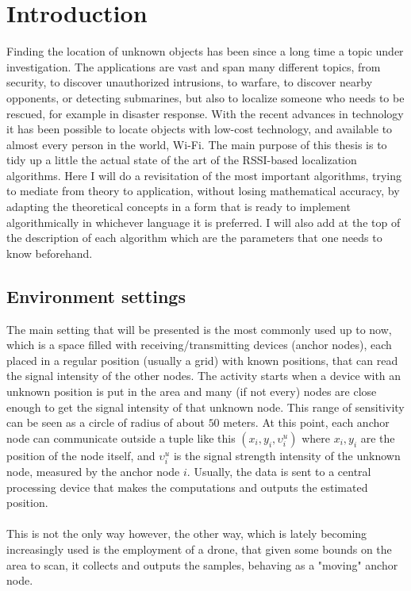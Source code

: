 \documentclass[12pt]{report}
\begin{document}
\clearpage %
\begingroup
  \thispagestyle{empty}
  \null
  \newpage
\endgroup


\thispagestyle{empty}
\tableofcontents
\thispagestyle{empty}

\clearpage %
\begingroup
  \thispagestyle{empty}
  \null
  \newpage
\endgroup


\setcounter{page}{1}

\chapter{Introduction}
Finding the location of unknown objects has been since a long time a topic under investigation. The applications are vast and span many different topics, from security, to discover unauthorized intrusions, to warfare, to discover nearby opponents, or detecting submarines, but also to localize someone who needs to be rescued, for example in disaster response. With the recent advances in technology it has been possible to locate objects with low-cost technology, and available to almost every person in the world, Wi-Fi. The main purpose of this thesis is to tidy up a little the actual state of the art of the RSSI-based localization algorithms. Here I will do a revisitation of the most important algorithms, trying to mediate from theory to application, without losing mathematical accuracy, by adapting the theoretical concepts in a form that is ready to implement algorithmically in whichever language it is preferred. I will also add at the top of the description of each algorithm which are the parameters that one needs to know beforehand.

\section{Environment settings}
The main setting that will be presented is the most commonly used up to now, which is a space filled with receiving/transmitting devices (anchor nodes), each placed in a regular position (usually a grid) with known positions, that can read the signal intensity of the other nodes. The activity starts when a device with an unknown position is put in the area and many (if not every) nodes are close enough to get the signal intensity of that unknown node. This range of sensitivity can be seen as a circle of radius of about $50$ meters. At this point, each anchor node can communicate outside a tuple like this $(x_i,y_i,\upsilon_i^u)$ where $x_i,y_i$ are the position of the node itself, and $\upsilon_i^u$ is the signal strength intensity of the unknown node, measured by the anchor node $i$. Usually, the data is sent to a central processing device that makes the computations and outputs the estimated position. \\\\
This is not the only way however, the other way, which is lately becoming increasingly used is the employment of a drone, that given some bounds on the area to scan, it collects and outputs the samples, behaving as a "moving" anchor node.
\end{document}
